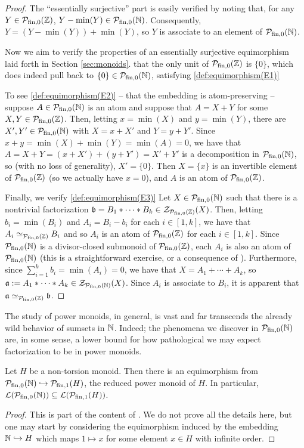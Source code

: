 \begin{proof}
The ``essentially surjective'' part is easily verified by noting that, for any $Y\in \mathcal{P}_{\textrm{fin}, 0}(\mathbb{Z})$, $Y-\min(Y)\in {\mathcal{P}_{\textrm{fin},0}(\mathbb{N})}$.
Consequently, $Y = (Y-\min(Y))+\min(Y)$, so $Y$ is associate to an element of ${\mathcal{P}_{\textrm{fin},0}(\mathbb{N})}$.

Now we aim to verify the properties of an essentially surjective equimorphism laid forth in Section \ref{sec:monoids}.
that the only unit of $\mathcal{P}_{\textrm{fin}, 0}(\mathbb{Z})$ is $\{0\}$, which does indeed pull back to $\{0\}\in {\mathcal{P}_{\textrm{fin},0}(\mathbb{N})}$, satisfying \ref{def:equimorphism(E1)}

To see \ref{def:equimorphism(E2)} -- that the embedding is atom-preserving -- suppose $A\in {\mathcal{P}_{\textrm{fin},0}(\mathbb{N})}$ is an atom and suppose that $A = X+Y$ for some $X,Y\in \mathcal{P}_{\textrm{fin}, 0}(\mathbb{Z})$.
Then, letting $x = \min(X)$ and $y = \min(Y)$, there are $X',Y'\in {\mathcal{P}_{\textrm{fin},0}(\mathbb{N})}$ with $X = x+ X'$ and $Y=y+Y'$.
Since $x+y = \min(X)+\min(Y) = \min(A) = 0$, we have that $A = X+Y = (x+X')+(y+Y') = X' + Y'$ is a decomposition in ${\mathcal{P}_{\textrm{fin},0}(\mathbb{N})}$, so (with no loss of generality), $X' = \{0\}$.
Then $X = \{x\}$ is an invertible element of $\mathcal{P}_{\textrm{fin}, 0}(\mathbb{Z})$ (so we actually have $x=0$), and $A$ is an atom of $\mathcal{P}_{\textrm{fin}, 0}(\mathbb{Z})$.

Finally, we verify \ref{def:equimorphism(E3)}
Let $X\in {\mathcal{P}_{\textrm{fin},0}(\mathbb{N})}$ such that there is a nontrivial factorization $\mathfrak{b}=B_1*\cdots*B_k\in\mathcal{Z}_{\mathcal{P}_{\textrm{fin}, 0}(\mathbb{Z})}(X)$.
Then, letting $b_i = \min(B_i)$ and $A_i = B_i - b_i$ for each $i\in[1,k]$, we have that $A_i \simeq_{\mathcal{P}_{\textrm{fin}, 0}(\mathbb{Z})} B_i$ and so $A_i$ is an atom of $\mathcal{P}_{\textrm{fin}, 0}(\mathbb{Z})$ for each $i\in[1,k]$.
Since ${\mathcal{P}_{\textrm{fin},0}(\mathbb{N})}$ is a divisor-closed submonoid of $\mathcal{P}_{\textrm{fin}, 0}(\mathbb{Z})$, each $A_i$ is also an atom of ${\mathcal{P}_{\textrm{fin},0}(\mathbb{N})}$ (this is a straightforward exercise, or a consequence of \cite[Lemma 2.2]{fan-tringali18}).
Furthermore, since $\sum_{i=1}^k b_i = \min(A_i)=0$, we have that $X = A_1+\cdots+ A_k$, so $\mathfrak{a}:=A_1*\cdots*A_k\in \mathcal{Z}_{{\mathcal{P}_{\textrm{fin},0}(\mathbb{N})}}(X)$.
Since $A_i$ is associate to $B_i$, it is apparent that $\mathfrak{a} \simeq_{\mathcal{P}_{\textrm{fin}, 0}(\mathbb{Z})} \mathfrak{b}$.
\end{proof}

The study of power monoids, in general, is vast and far transcends the already wild behavior of sumsets in $\mathbb{N}$.
Indeed; the phenomena we discover in ${\mathcal{P}_{\textrm{fin},0}(\mathbb{N})}$ are, in some sense, a lower bound for how pathological we may expect factorization to be in power monoids.

\begin{prop}\label{prop:natural-to-non-tors}
Let $H$ be a non-torsion monoid.
Then there is an equimorphism from ${\mathcal{P}_{\textrm{fin},0}(\mathbb{N})} \hookrightarrow \mathcal{P}_{\textrm{fin}, 1}(H)$, the reduced power monoid of $H$.
In particular, $\mathcal{L}({\mathcal{P}_{\textrm{fin},0}(\mathbb{N})}) \subseteq \mathcal{L}(\mathcal{P}_{\textrm{fin}, 1}(H))$.
\end{prop}
\begin{proof}
This is part of the content of \cite[Theorem 4.11]{fan-tringali18}. 
We do not prove all the details here, but one may start by considering the equimorphism induced by the embedding $\mathbb{N}\hookrightarrow H$ which maps $1\mapsto x$ for some element $x\in H$ with infinite order.  
\end{proof}

